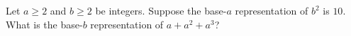 Let $a\ge2$ and $b\ge2$ be integers. Suppose the base-$a$ representation of $b^2$ is $10$. What is the base-$b$ representation of $a+a^2+a^3$?
